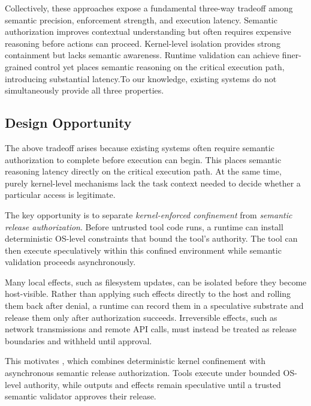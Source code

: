 Collectively, these approaches expose a fundamental three-way tradeoff among semantic precision, enforcement strength, and execution latency. Semantic authorization improves contextual understanding but often requires expensive reasoning before actions can proceed. Kernel-level isolation provides strong containment but lacks semantic awareness. Runtime validation can achieve finer-grained control yet places semantic reasoning on the critical execution path, introducing substantial latency.To our knowledge, existing systems do not simultaneously provide all three properties.

\subsection{Design Opportunity}

The above tradeoff arises because existing systems often require semantic
authorization to complete before execution can begin. This places semantic
reasoning latency directly on the critical execution path. At the same time,
purely kernel-level mechanisms lack the task context needed to decide whether a
particular access is legitimate.

The key opportunity is to separate \emph{kernel-enforced confinement} from
\emph{semantic release authorization}. Before untrusted tool code runs, a
runtime can install deterministic OS-level constraints that bound the tool's
authority. The tool can then execute speculatively within this confined
environment while semantic validation proceeds asynchronously.

Many local effects, such as filesystem updates, can be isolated before they
become host-visible. Rather than applying such effects directly to the host and
rolling them back after denial, a runtime can record them in a speculative
substrate and release them only after authorization succeeds. Irreversible
effects, such as network transmissions and remote API calls, must instead be
treated as release boundaries and withheld until approval.

This motivates \SystemName, which combines deterministic kernel confinement with
asynchronous semantic release authorization. Tools execute under bounded
OS-level authority, while outputs and effects remain speculative until a trusted
semantic validator approves their release.